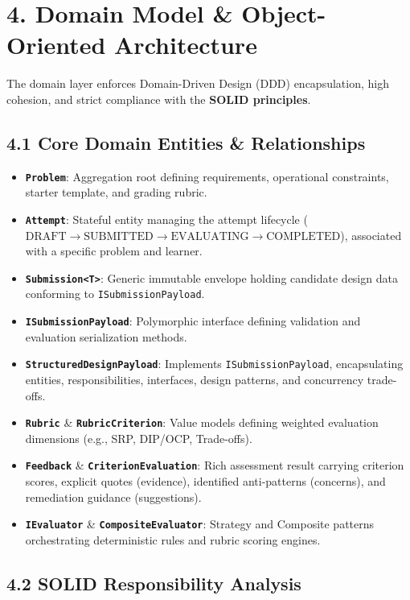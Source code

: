 \documentclass[10pt,a4paper]{article}
\begin{document}
\section{4. Domain Model \& Object-Oriented Architecture}

The domain layer enforces Domain-Driven Design (DDD) encapsulation, high cohesion, and strict compliance with the \textbf{SOLID principles}.

\subsection{4.1 Core Domain Entities \& Relationships}
\begin{itemize}
  \item \textbf{\texttt{Problem}}: Aggregation root defining requirements, operational constraints, starter template, and grading rubric.
  \item \textbf{\texttt{Attempt}}: Stateful entity managing the attempt lifecycle ($\text{DRAFT} \rightarrow \text{SUBMITTED} \rightarrow \text{EVALUATING} \rightarrow \text{COMPLETED}$), associated with a specific problem and learner.
  \item \textbf{\texttt{Submission<T>}}: Generic immutable envelope holding candidate design data conforming to \texttt{ISubmissionPayload}.
  \item \textbf{\texttt{ISubmissionPayload}}: Polymorphic interface defining validation and evaluation serialization methods.
  \item \textbf{\texttt{StructuredDesignPayload}}: Implements \texttt{ISubmissionPayload}, encapsulating entities, responsibilities, interfaces, design patterns, and concurrency trade-offs.
  \item \textbf{\texttt{Rubric}} \& \textbf{\texttt{RubricCriterion}}: Value models defining weighted evaluation dimensions (e.g., SRP, DIP/OCP, Trade-offs).
  \item \textbf{\texttt{Feedback}} \& \textbf{\texttt{CriterionEvaluation}}: Rich assessment result carrying criterion scores, explicit quotes (evidence), identified anti-patterns (concerns), and remediation guidance (suggestions).
  \item \textbf{\texttt{IEvaluator}} \& \textbf{\texttt{CompositeEvaluator}}: Strategy and Composite patterns orchestrating deterministic rules and rubric scoring engines.
\end{itemize}

\subsection{4.2 SOLID Responsibility Analysis}
\end{document}
